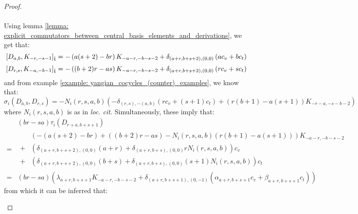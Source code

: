 \begin{proof}
\begin{enumerate}
$$\begin{aligned}
                            \end{aligned}
                        $$
                    Using lemma \ref{lemma: explicit_commutators_between_central_basis_elements_and_derivations}, we get that:
                        $$[D_{a, b}, K_{-r, -s - 1}]_{\hat{\mathfrak{t}}} = -\left( a(s + 2) - br \right) K_{-a - r, -b - s - 2} + \delta_{(a + r, b + s + 2), (0, 0)} \left( a c_v + b c_t \right)$$
                        $$[D_{r, s}, K_{-a, -b - 1}]_{\hat{\mathfrak{t}}} = -\left( (b + 2) r - as \right) K_{-a - r, -b - s - 2} + \delta_{(a + r, b + s + 2), (0, 0)} \left( r c_v + s c_t \right)$$
                    and from example \ref{example: yangian_cocycles_(counter)_examples}, we know that:
                        $$\sigma_i(D_{a, b}, D_{r, s}) = -N_i(r, s, a, b) \left( -\delta_{(r, s), -(a, b)} (r c_v + (s + 1) c_t) + ( r(b + 1) - a(s + 1) )K_{-r - a, -s - b - 2} \right)$$
                    where $N_i(r, s, a, b)$ is as in \textit{loc. cit.} Simultaneously, these imply that:
                        $$
                            \begin{aligned}
                                & (br - sa) \tau_i(D_{r + a, b + s + 1})
                                \\
                                = &
                                \begin{aligned}
                                    & \left( -\left( a(s + 2) - br \right) + \left( (b + 2) r - as \right) - N_i(r, s, a, b)( r(b + 1) - a(s + 1) ) \right) K_{-a - r, -b - s - 2}
                                    \\
                                    + & \left( \delta_{(a + r, b + s + 2), (0, 0)} (a + r) + \delta_{(a + r, b + s), (0, 0)} r N_i(r, s, a, b) \right) c_v
                                    \\
                                    + & \left( \delta_{(a + r, b + s + 2), (0, 0)} (b + s) + \delta_{(a + r, b + s), (0, 0)} (s + 1)N_i(r, s, a, b) \right) c_t
                                \end{aligned}
                                \\
                                = & (br - sa) \left( \lambda_{a + r, b + s + 1} K_{-a - r, -b - s - 2} + \delta_{(a + r, b + s + 1), (0, -1)}( \alpha_{a + r, b + s + 1} c_v + \beta_{a + r, b + s + 1} c_t ) \right)
                            \end{aligned}
                        $$
                    from which it can be inferred that:

\end{enumerate}
\end{proof}

